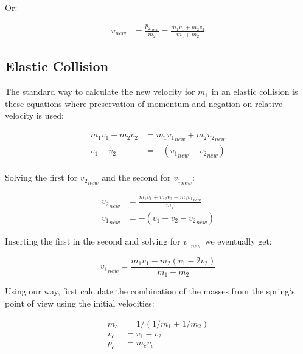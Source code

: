 \documentclass[]{elementary-physics}
\begin{document}
Or:

\begin{subequations}
\begin{align}
{v}_{new} &= \frac{{p_2}_{new}}{m_2} = \frac{m_1 v_1 + m_2 v_2}{m_1 + m_2}
\end{align}
\end{subequations}

\subsection{Elastic Collision}

The standard way to calculate the new velocity for $m_1$ in an elastic collision is these equations where preservation of momentum and negation on relative velocity is used:

\begin{subequations}
\begin{align}
m_1 v_1 + m_2 v_2 &= m_1 {v_1}_{new} + m_2 {v_2}_{new} \\
v_1 - v_2 &= -({v_1}_{new} - {v_2}_{new}) \\
\end{align}
\end{subequations}

Solving the first for ${v_2}_{new}$ and the second for ${v_1}_{new}$:

\begin{subequations}
\begin{align}
{v_2}_{new} &= \frac{m_1 v_1 + m_2 v_2 - m_1 {v_1}_{new}}{m_2} \\
{v_1}_{new} &= -(v_1 - v_2 - {v_2}_{new})
\end{align}
\end{subequations}

Inserting the first in the second and solving for ${v_1}_{new}$ we eventually get:

\begin{equation}
{v_1}_{new} = \frac{m_1 v_1 - m_2(v_1-2 v_2)}{m_1 + m_2}
\end{equation}

Using our way, first calculate the combination of the masses from the spring`s point of view using the initial velocities:

\begin{subequations}
\begin{align}
m_c &= 1/(1/m_1 + 1/m_2) \\
v_c &= v_1 - v_2 \\
p_c &= m_c v_c
\end{align}
\end{subequations}
\end{document}
